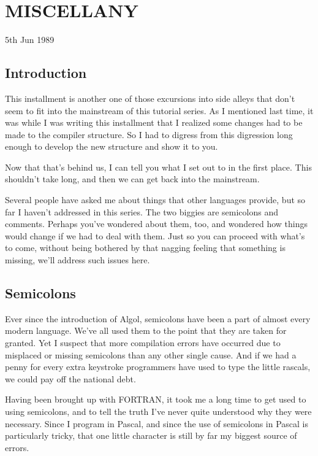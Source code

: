 
\chapter{MISCELLANY}

5th Jun 1989

\section{Introduction}

This installment is another one  of  those  excursions  into side alleys  that  don't  seem to fit  into  the  mainstream  of  this tutorial  series. As I mentioned last time, it was while I was writing this installment that I realized some changes  had  to be made  to  the  compiler structure. So I had to digress from this digression long enough to develop the new structure  and  show it to you.

Now that that's behind us, I can tell you what I  set  out  to in the first place. This shouldn't  take  long, and then we can get back into the mainstream.

Several people have asked  me  about  things that other languages provide, but so far I haven't addressed in this series. The two biggies are semicolons and  comments. Perhaps  you've wondered about them, too, and  wondered  how things would change if we had to  deal with them. Just so you can proceed with what's to come, without being  bothered by that nagging feeling that something is missing, we'll address such issues here.

\section{Semicolons}

Ever since the introduction of Algol, semicolons have been a part of  almost every modern language. We've all  used  them  to  the point that they are taken for  granted. Yet I suspect that more compilation errors have  occurred  due  to  misplaced  or missing semicolons  than  any  other single cause. And if we had a penny for  every  extra  keystroke programmers have used  to  type  the little rascals, we could pay off the national debt.

Having  been  brought  up with FORTRAN, it took me a long time to get used to using semicolons, and to tell the  truth  I've  never quite understood why they  were  necessary. Since I program in Pascal, and since the use of semicolons in Pascal is particularly tricky, that one little character is still  by  far  my  biggest source of errors.

